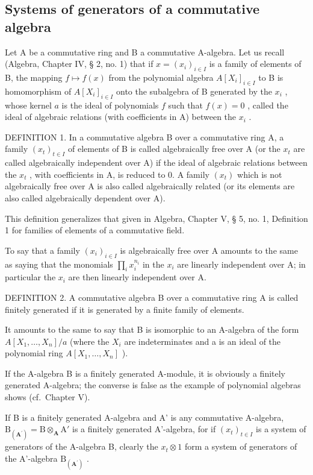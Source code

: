 \subsection{Systems of generators of a commutative algebra}

Let A be a commutative ring and B a commutative A-algebra. Let us recall (Algebra, Chapter IV, § 2, no. 1) that if \(x = (x_{i})_{i \in I}\) is a family of elements of B, the mapping \(f \mapsto f(x)\) from the polynomial algebra \(A[X_{i}]_{i \in I}\) to B is homomorphism of \(A[X_{i}]_{i \in I}\) onto the subalgebra of B generated by the \(x_{i}\) , whose kernel \(a\) is the ideal of polynomials \(f\) such that \(f(x) = 0\) , called the ideal of algebraic relations (with coefficients in A) between the \(x_{i}\) .

DEFINITION 1. In a commutative algebra B over a commutative ring A, a family \((x_{t})_{t\in I}\) of elements of B is called algebraically free over A (or the \(x_{t}\) are called algebraically independent over A) if the ideal of algebraic relations between the \(x_{t}\) , with coefficients in A, is reduced to 0. A family \((x_{t})\) which is not algebraically free over A is also called algebraically related (or its elements are also called algebraically dependent over A).

This definition generalizes that given in Algebra, Chapter V, § 5, no. 1, Definition 1 for families of elements of a commutative field.

To say that a family \((x_{i})_{i\in I}\) is algebraically free over A amounts to the same as saying that the monomials \(\prod_{i}x_{i}^{n_{i}}\) in the \(x_{i}\) are linearly independent over A; in particular the \(x_{i}\) are then linearly independent over A.

DEFINITION 2. A commutative algebra B over a commutative ring A is called finitely generated if it is generated by a finite family of elements.

It amounts to the same to say that B is isomorphic to an A-algebra of the form \(A[X_{1},\ldots,X_{n}]/a\) (where the \(X_{i}\) are indeterminates and a is an ideal of the polynomial ring \(A[X_{1},\ldots,X_{n}]\) ).

If the A-algebra B is a finitely generated A-module, it is obviously a finitely generated A-algebra; the converse is false as the example of polynomial algebras shows (cf.~Chapter V).

If B is a finitely generated A-algebra and A' is any commutative A-algebra, \(\mathrm{B}_{(\mathbf{A}^{\prime})} = \mathrm{B} \otimes_{\mathbf{A}} \mathrm{A}'\) is a finitely generated A'-algebra, for if \((x_{t})_{t \in I}\) is a system of generators of the A-algebra B, clearly the \(x_{t} \otimes 1\) form a system of generators of the A'-algebra \(\mathrm{B}_{(\mathbf{A}^{\prime})}\) .


